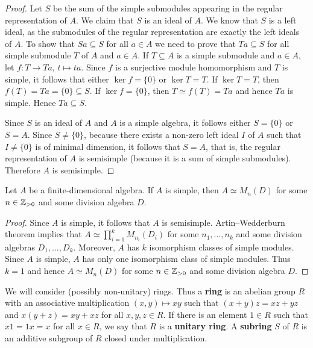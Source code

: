 \begin{proof}
	Let $S$ be the sum of the simple submodules appearing in the regular representation of $A$. 
	We claim that $S$ is an ideal of $A$. We know that $S$ is a left ideal, as the submodules of the regular representation
	are exactly the left ideals of $A$. To show that $Sa\subseteq S$ for all $a\in A$ we need to prove that 
	$Ta\subseteq S$ for all simple submodule $T$ of $A$ and $a\in A$. 
	If $T\subseteq A$ is a simple submodule and $a\in A$, 
	let $f\colon T\to Ta$, $t\mapsto ta$. Since $f$ is a surjective 
	module homomorphism and $T$ is simple, it follows that
	either $\ker f=\{0\}$ or $\ker T=T$. If $\ker T=T$, then 
	$f(T)=Ta=\{0\}\subseteq S$. If $\ker f=\{0\}$, then $T\simeq f(T)=Ta$ and hence $Ta$ is simple. Hence $Ta\subseteq S$. 
	
	Since $S$ is an ideal of $A$ and $A$
	is a simple algebra, it follows either $S=\{0\}$ or $S=A$.  Since $S\ne\{0\}$, because  
	there exists a non-zero left ideal $I$ of $A$ such that $I\ne\{0\}$ is of minimal dimension, 
	it follows that $S=A$, that is, the regular representation of $A$ is semisimple (because it is a sum of simple submodules). Therefore 
	$A$ is semisimple. 
\end{proof}

\begin{theorem}[Wedderburn]
	Let $A$ be a finite-dimensional algebra. If $A$ is simple, then 
	$A\simeq M_n(D)$ for some $n\in\mathbb{Z}_{>0}$ and some division algebra $D$. 
\end{theorem}

\begin{proof}
	Since $A$ is simple, it follows that $A$ is semisimple. Artin--Wedderburn theorem implies that $A\simeq\prod_{i=1}^k M_{n_i}(D_i)$ 
	for some $n_1,\dots,n_k$ and some division algebras $D_1,\dots,D_k$. Moreover, $A$ has 
	$k$ isomorphism classes of simple modules. Since $A$ is simple,
	$A$ has only one isomorphism class of simple modules. Thus $k=1$ and hence 
	$A\simeq M_n(D)$ for some $n\in\mathbb{Z}_{>0}$ and some division algebra $D$. 
\end{proof}

\label{Primitive rings}

We will consider (possibly non-unitary) rings. Thus  
a \textbf{ring} is an abelian group $R$ with an associative multiplication 
$(x,y)\mapsto xy$ such that $(x+y)z=xz+yz$ and $x(y+z)=xy+xz$ for all $x,y,z\in
R$. If there is an element $1\in R$ such that $x1=1x=x$ for all $x\in R$, we 
say that $R$ is a \textbf{unitary ring}.  A \textbf{subring} $S$ of $R$ is an additive
subgroup of $R$ closed under multiplication. 


